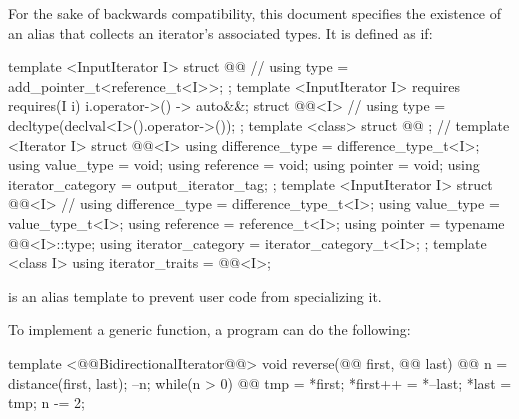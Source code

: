 \begin{addedblock}
\pnum
For the sake of backwards compatibility, this document specifies the existence of an 
alias that collects an iterator's associated types. It is defined as if:

%
\begin{codeblock}
  template <InputIterator I> struct @@ {        // \expos
    using type = add_pointer_t<reference_t<I>>;
  };
  template <InputIterator I>
    requires requires(I i) { { i.operator->() } -> auto&&; }
  struct @@<I> {                                    // \expos
    using type = decltype(declval<I>().operator->());
  };
  template <class> struct @@ { };                // \expos
  template <Iterator I> struct @@<I> {
    using difference_type = difference_type_t<I>;
    using value_type = void;
    using reference = void;
    using pointer = void;
    using iterator_category = output_iterator_tag;
  };
  template <InputIterator I> struct @@<I> {  // \expos
    using difference_type = difference_type_t<I>;
    using value_type = value_type_t<I>;
    using reference = reference_t<I>;
    using pointer = typename @@<I>::type;
    using iterator_category = iterator_category_t<I>;
  };
  template <class I>
    using iterator_traits = @@<I>;
\end{codeblock}

\pnum
\enternote
{} is an alias template
to prevent user code from specializing it.
\exitnote

\end{addedblock}

\pnum
\enterexample
To implement a generic
function, a \Cpp program can do the following:

\begin{codeblock}
template <@@BidirectionalIterator@@>
void reverse(@@ first, @@ last) {
  @@ n =
    distance(first, last);
  --n;
  while(n > 0) {
    @@
      tmp = *first;
    *first++ = *--last;
    *last = tmp;
    n -= 2;
  }
}
\end{codeblock}
\exitexample

